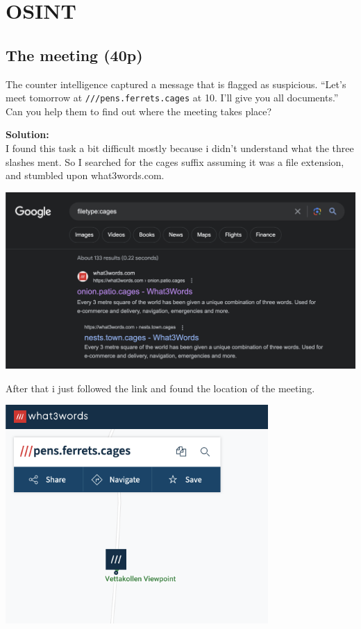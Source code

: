 \newpage
\section{OSINT}

\subsection{The meeting (40p)}
The counter intelligence captured a message that is flagged as suspicious. ``Let's meet tomorrow at \texttt{///pens.ferrets.cages} at 10. I'll give you all documents.'' Can you help them to find out where the meeting takes place?

\textbf{Solution:}\\
I found this task a bit difficult mostly because i didn't understand what the three slashes ment. So I searched for the cages suffix assuming it was a file extension, and stumbled upon what3words.com.

\includegraphics[width=15cm]{img/OSINT/The meeting/Skjermbilde 2023-08-28 kl. 13.04.36.png}

After that i just followed the link and found the location of the meeting.

\includegraphics[width=10cm]{img/OSINT/The meeting/Skjermbilde 2023-08-28 kl. 13.03.54.png}

